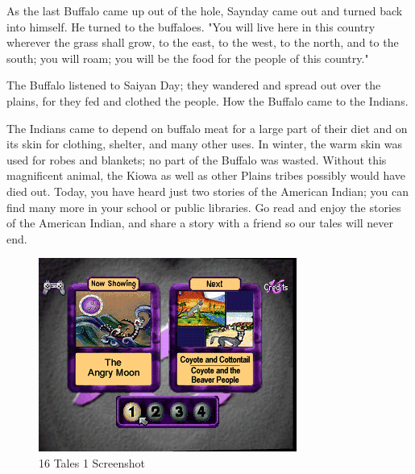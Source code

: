 As the last Buffalo came up out of the hole, Saynday came out and turned back into himself. He turned to the buffaloes. "You will live here in this country wherever the grass shall grow, to the east, to the west, to the north, and to the south; you will roam; you will be the food for the people of this country."

The Buffalo listened to Saiyan Day; they wandered and spread out over the plains, for they fed and clothed the people. How the Buffalo came to the Indians.

The Indians came to depend on buffalo meat for a large part of their diet and on its skin for clothing, shelter, and many other uses. In winter, the warm skin was used for robes and blankets; no part of the Buffalo was wasted. Without this magnificent animal, the Kiowa as well as other Plains tribes possibly would have died out. Today, you have heard just two stories of the American Indian; you can find many more in your school or public libraries. Go read and enjoy the stories of the American Indian, and share a story with a friend so our tales will never end.

\clearpage
\newpage

\begin{figure}
    \centering
    \includegraphics[width=\textwidth/2]{"./Games/16Tales/Images/16Tales1Screenshot.png"}
    \caption{16 Tales 1 Screenshot}
\end{figure}